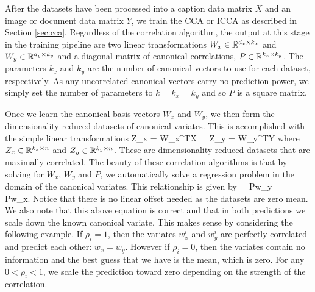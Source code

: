 After the datasets have been processed into a caption data matrix $X$ and an image or
document data matrix $Y$, we train the CCA or ICCA as described in Section
\ref{sec:cca}. Regardless of the correlation algorithm, the output at this stage in the
training pipeline are two linear transformations $W_x\in\mathbb{R}^{d_x\times k_x}$ and
$W_y\in\mathbb{R}^{d_y \times k_y}$ and a diagonal matrix of canonical correlations,
$P\in\mathbb{R}^{k_x\times k_y}$. The parameters $k_x$ and $k_y$ are the number of canonical
vectors to use for each dataset, respectively. As any uncorrelated canonical vectors carry
no prediction power, we simply set the number of parameters to $k=k_x=k_y$ and so $P$ is a
square matrix.

Once we learn the canonical basis vectors $W_x$ and $W_y$, we then form
the dimensionality reduced datasets of canonical variates. This is accomplished with the
simple linear transformations
\be
Z_x = W_x^TX\,\,\,\,\,\,\, Z_y = W_y^TY
\ee
where $Z_x\in\mathbb{R}^{k_x\times n}$ and $Z_y\in\mathbb{R}^{k_y\times n}$. These are
dimensionality reduced datasets that are maximally correlated. The beauty of these
correlation algorithms is that by solving for $W_x$, $W_y$ and $P$, we automatically solve
a regression problem in the domain of the canonical variates. This relationship is given by
\be
{} = Pw_y \,   = Pw_x.
\ee
Notice that there is no linear offset needed as the datasets are zero mean. We also note
that this above equation is correct and that in both predictions we scale down the known
canonical variate. This makes sense by considering the following example. If $\rho_i=1$, then the
variates $w_x^{i}$ and $w_y^{i}$ are perfectly correlated and predict each other:
$w_x=w_y$. However if $\rho_i=0$, then the variates contain no information and the best
guess that we have is the mean, which is zero. For any $0<\rho_i<1$, we scale the
prediction toward zero depending on the strength of the correlation.

